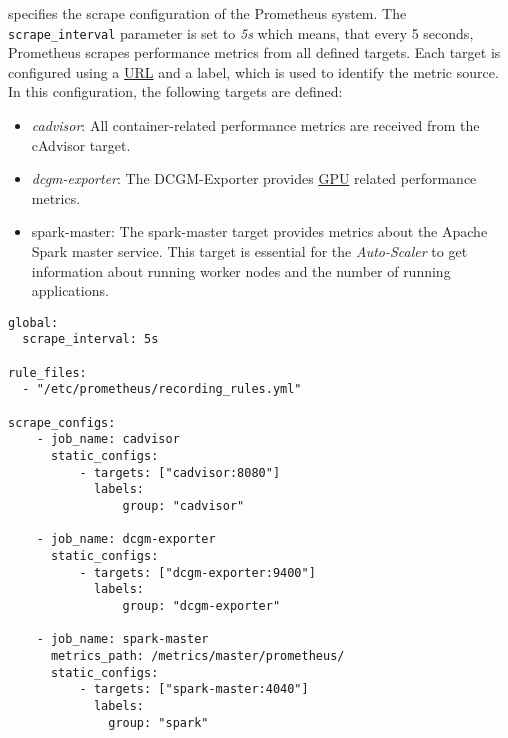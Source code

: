  specifies the scrape configuration of the Prometheus system.
The \texttt{scrape\_interval} parameter is set to \textit{5s} which means, that every 5 seconds, Prometheus scrapes performance metrics from all defined targets.
Each target is configured using a \hyperlink{abbr:url}{URL} and a label, which is used to identify the metric source.
In this configuration, the following targets are defined:
\begin{itemize}
\item \textit{cadvisor}: All container-related performance metrics are received from the cAdvisor target.

\item \textit{dcgm-exporter}: The DCGM-Exporter provides \hyperlink{abbr:gpu}{GPU} related performance metrics.

\item spark-master: The spark-master target provides metrics about the Apache Spark master service. This target is essential for the \textit{Auto-Scaler} to get information about running worker nodes and the number of running applications.
\end{itemize}
\newpage
\begin{lstlisting}[label=lst:06_computing_am_prom-config, caption=Prometheus target configuration in YAML syntax]
global:
  scrape_interval: 5s
 
rule_files:
  - "/etc/prometheus/recording_rules.yml"
 
scrape_configs:
    - job_name: cadvisor
      static_configs:
          - targets: ["cadvisor:8080"]
            labels:
                group: "cadvisor"
 
    - job_name: dcgm-exporter
      static_configs:
          - targets: ["dcgm-exporter:9400"]
            labels:
                group: "dcgm-exporter"
    
    - job_name: spark-master
      metrics_path: /metrics/master/prometheus/
      static_configs:
          - targets: ["spark-master:4040"]
            labels:
              group: "spark"
\end{lstlisting}


